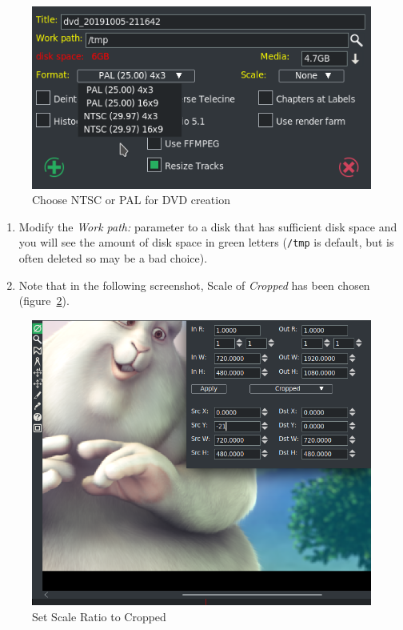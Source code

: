 \begin{figure}[htpb]
    \centering
    \includegraphics[width=0.7\linewidth]{images/dvd01.png}
    \caption{Choose NTSC or PAL for DVD creation}
    \label{fig:dvd-000}
\end{figure}

\begin{enumerate}[start=6]
    \item Modify the \textit{Work path:} parameter to a disk that has sufficient disk space and you will see the
    amount of disk space in green letters (\texttt{/tmp} is default, but is often deleted so may be a bad choice).
    \item Note that in the following screenshot, Scale of \textit{Cropped} has been chosen (figure~\ref{fig:dvd03}).    
\end{enumerate}

\begin{figure}[htpb]
    \centering
    \includegraphics[width=0.9\linewidth]{images/dvd03.png}
    \caption{Set Scale Ratio to Cropped}
    \label{fig:dvd03}
\end{figure}


